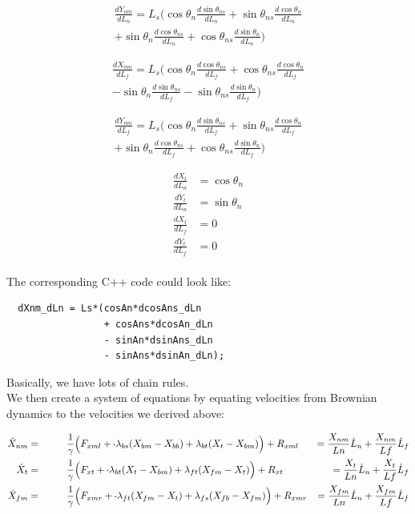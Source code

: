 \documentclass[11pt,twocolumn]{article}
\newcommand{\mn}{\scalebox{0.7}[1.0]{-}}
\begin{document}
\begin{multline}
  \frac{dY_{nm}}{dL_n} = L_s\Big(
  \cos\theta_n\frac{d\sin\theta_{ns}}{dL_n}
  + \sin\theta_{ns}\frac{d\cos\theta_{n}}{dL_n} \\
  + \sin\theta_n\frac{d\cos\theta_{ns}}{dL_n}
  + \cos\theta_{ns}\frac{d\sin\theta_{n}}{dL_n}
  \Big)
\end{multline}

\begin{multline}
  \frac{dX_{nm}}{dL_f} = L_s\Big(
  \cos\theta_n\frac{d\cos\theta_{ns}}{dL_f}
  + \cos\theta_{ns}\frac{d\cos\theta_{n}}{dL_f} \\
  - \sin\theta_n\frac{d\sin\theta_{ns}}{dL_f}
  - \sin\theta_{ns}\frac{d\sin\theta_{n}}{dL_f}
  \Big)
\end{multline}

\begin{multline}
  \frac{dY_{nm}}{dL_f} = L_s\Big(
  \cos\theta_n\frac{d\sin\theta_{ns}}{dL_f}
  + \sin\theta_{ns}\frac{d\cos\theta_{n}}{dL_f} \\
  + \sin\theta_n\frac{d\cos\theta_{ns}}{dL_f}
  + \cos\theta_{ns}\frac{d\sin\theta_{n}}{dL_f}
  \Big)
\end{multline}

\begin{align}
  \frac{dX_{t}}{dL_n} &= \cos\theta_n\\
  \frac{dY_{t}}{dL_n} &= \sin\theta_n\\
  \frac{dX_{t}}{dL_f} &= 0\\
  \frac{dY_{t}}{dL_f} &= 0\\
\end{align}

The corresponding C++ code could look like:
\begin{verbatim}
  dXnm_dLn = Ls*(cosAn*dcosAns_dLn
                 + cosAns*dcosAn_dLn
                 - sinAn*dsinAns_dLn
                 - sinAns*dsinAn_dLn);
\end{verbatim}
Basically, we have lots of chain rules.\\

We then create a system of equations by equating velocities from Brownian dynamics to the velocities
we derived above:

\onecolumn

\begin{align}
  \dot{X}_{nm} = \hspace{1cm}& \frac{1}{\gamma} \Big(F_{xml} + \mn \lambda_{bs}(X_{bm} - X_{bb})
  + \lambda_{bt}(X_{t } - X_{bm}) \Big) + R_{xml}
  &= \frac{X_{nm}}{Ln}\dot{L}_n + \frac{X_{nm}}{Lf}\dot{L}_f\\
  \dot{X}_{t } = \hspace{1cm}& \frac{1}{\gamma} \Big(F_{xt } + \mn \lambda_{bt}(X_{t } - X_{bm})
  + \lambda_{ft}(X_{fm} - X_{t }) \Big) + R_{xt }
  &= \frac{X_{t}}{Ln}\dot{L}_n + \frac{X_{t}}{Lf}\dot{L}_f\\
  \dot{X}_{fm} = \hspace{1cm}& \frac{1}{\gamma} \Big(F_{xmr} + \mn \lambda_{ft}(X_{fm} - X_{t })
  + \lambda_{fs}(X_{fb} - X_{fm}) \Big) + R_{xmr}
  &= \frac{X_{fm}}{Ln}\dot{L}_n + \frac{X_{fm}}{Lf}\dot{L}_f
\end{align}
\end{document}
